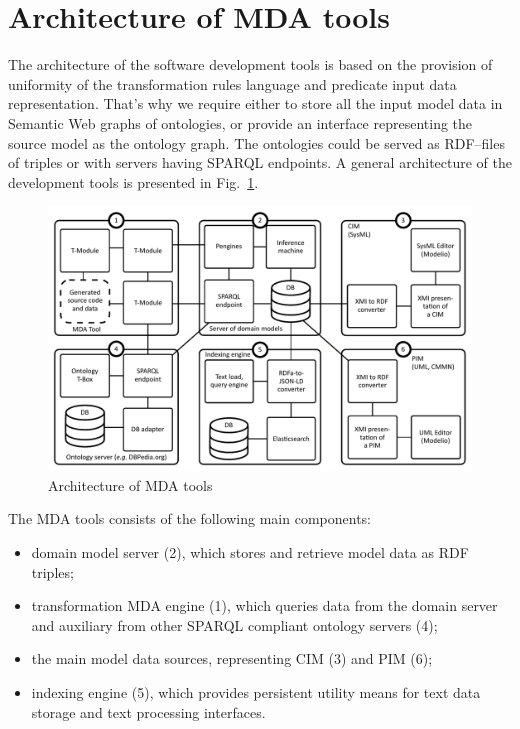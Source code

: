 \documentclass[12pt,a4paper]{llncs}
\begin{document}
\section{Architecture of MDA tools}


The architecture of the software development tools is based on the provision of uniformity of the transformation rules language and predicate input data representation.  That's why we require either to store all the input model data in Semantic Web graphs of ontologies, or provide an interface representing the source model as the ontology graph.  The ontologies could be served as RDF--files of triples or with servers having SPARQL endpoints.  A general architecture of the development tools is presented in Fig.~\ref{fig:archi}.

\begin{figure}[htb]
  \centering
   \includegraphics[width=0.8\linewidth]{pics/architecture-mda-lod-ext.pdf}
  \caption{Architecture of MDA tools}
  \label{fig:archi}
\end{figure}

The MDA tools consists of the following main components:
\begin{itemize}
\item domain model server (2), which stores and retrieve model data as RDF triples;
\item transformation MDA engine (1), which queries data from the domain server and auxiliary from other SPARQL compliant ontology servers (4);
\item the main model data sources, representing CIM (3) and PIM (6);
\item indexing engine (5), which provides persistent utility means for text data storage and text processing interfaces.
\end{itemize}
\end{document}
